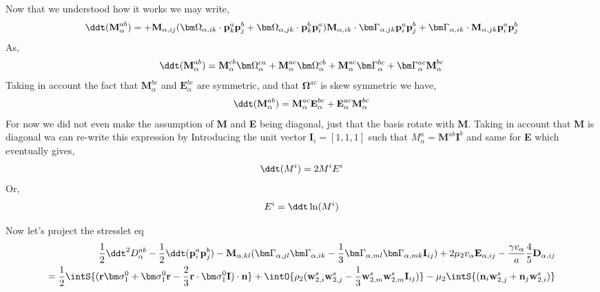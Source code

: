 Now that we understood how it works we may write, 
\begin{align*}
    \ddt (\textbf{M}^{ab}_\alpha)
    = 
    + \textbf{M}_{\alpha,ij}(
    \bm\Omega_{\alpha,ik}\cdot\textbf{p}_k^a\textbf{p}_j^b
    + \bm\Omega_{\alpha,jk}\cdot\textbf{p}_k^b\textbf{p}_i^a
    )
    \textbf{M}_{\alpha,ik} \cdot \bm\Gamma_{\alpha,jk}\textbf{p}_i^a \textbf{p}_j^b
    +  \bm\Gamma_{\alpha,ik} \cdot \textbf{M}_{\alpha,jk}\textbf{p}_i^a \textbf{p}_j^b
\end{align*}
As, 
\begin{align*}
    \ddt (\textbf{M}^{ab}_\alpha)
    = 
    \textbf{M}^{cb}_\alpha\bm\Omega^{ca}_\alpha
    + \textbf{M}^{ac}_\alpha\bm\Omega^{cb}_\alpha
    + \textbf{M}^{ac}_\alpha \bm\Gamma^{bc}_\alpha 
    +  \bm\Gamma^{ac}_\alpha \textbf{M}^{bc}_\alpha
\end{align*}
Taking in account the fact that $\textbf{M}^{bc}_\alpha$ and $\textbf{E}^{bc}_\alpha$ are symmetric, and that $\bm\Omega^{ac}$ is skew symmetric we have, 
\begin{align*}
    \ddt (\textbf{M}^{ab}_\alpha)
    = 
    \textbf{M}^{ac}_\alpha \textbf{E}^{bc}_\alpha 
    +  \textbf{E}^{ac}_\alpha \textbf{M}^{bc}_\alpha
\end{align*}
For now we did not even make the assumption of \textbf{M} and \textbf{E} being diagonal, just that the basis rotate with \textbf{M}.
Taking in account that \textbf{M} is diagonal wa can re-write this expression by Introducing the unit vector $\textbf{I}_i = [1,1,1]$ such that $M_\alpha^a = \textbf{M}^{ab} \textbf{I}^b$ and same for \textbf{E} which eventually gives, 
\begin{align*}
    \ddt (M^i)
    = 
    2M^iE^i
\end{align*}
Or, 
\begin{align*}
    E^i = \ddt \ln(M^i)
\end{align*}

Now let's project the stresslet eq
\begin{align*}
    \frac{1}{2}\ddt^2 D^{ab}_\alpha
    - \frac{1}{2}\ddt (\textbf{p}_i^a\textbf{p}_j^b)
    -   \textbf{M}_{\alpha,kl} 
    (\bm\Gamma_{\alpha,jl}\bm\Gamma_{\alpha,ik}  
    - \frac{1}{3}
    \bm\Gamma_{\alpha,ml}\bm\Gamma_{\alpha,mk}  
    \textbf{I}_{ij}
    )
    + 2 \mu_2 v_\alpha \textbf{E}_{\alpha,ij}
    - \frac{\gamma v_\alpha }{a} 
    \frac{4  }{5} \textbf{D}_{\alpha,ij}
    \\
    = 
    \frac{1}{2}\intS{(\textbf{r}\bm\sigma_1^0 + \bm\sigma_1^0\textbf{r} - \frac{2}{3}\textbf{r}\cdot \bm\sigma_1^0 \textbf{I})\cdot \textbf{n}} 
    + \intO{\rho_2 (\textbf{w}_{2,i}^s\textbf{w}_{2,j}^s - \frac{1}{3}\textbf{w}_{2,m}^s\textbf{w}_{2,m}^s \textbf{I}_{ij}) }
    - \mu_2 \intS{(\textbf{n}_i \textbf{w}_{2,j}^s + \textbf{n}_j \textbf{w}_{2,i}^s)}\\
\end{align*}

